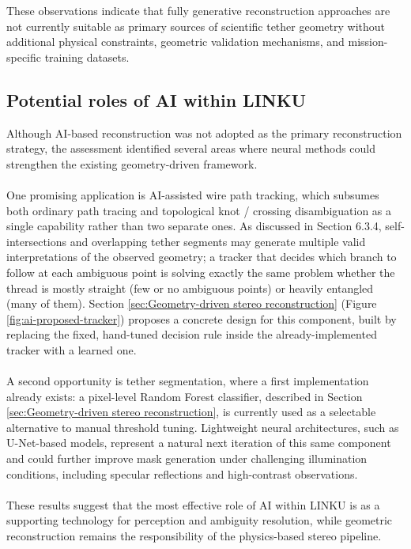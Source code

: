 These observations indicate that fully generative reconstruction approaches are not currently suitable as primary sources of scientific tether geometry without additional physical constraints, geometric validation mechanisms, and mission-specific training datasets.

\subsection{Potential roles of AI within LINKU}

Although AI-based reconstruction was not adopted as the primary reconstruction strategy, the assessment identified several areas where neural methods could strengthen the existing geometry-driven framework.
\\\\
One promising application is AI-assisted wire path tracking, which subsumes both ordinary path tracing and topological knot / crossing disambiguation as a single capability rather than two separate ones. As discussed in Section 6.3.4, self-intersections and overlapping tether segments may generate multiple valid interpretations of the observed geometry; a tracker that decides which branch to follow at each ambiguous point is solving exactly the same problem whether the thread is mostly straight (few or no ambiguous points) or heavily entangled (many of them). Section \ref{sec:Geometry-driven stereo reconstruction} (Figure \ref{fig:ai-proposed-tracker}) proposes a concrete design for this component, built by replacing the fixed, hand-tuned decision rule inside the already-implemented tracker with a learned one.
\\\\
A second opportunity is tether segmentation, where a first implementation already exists: a pixel-level Random Forest classifier, described in Section \ref{sec:Geometry-driven stereo reconstruction}, is currently used as a selectable alternative to manual threshold tuning. Lightweight neural architectures, such as U-Net-based models, represent a natural next iteration of this same component and could further improve mask generation under challenging illumination conditions, including specular reflections and high-contrast observations.
\\\\
These results suggest that the most effective role of AI within LINKU is as a supporting technology for perception and ambiguity resolution, while geometric reconstruction remains the responsibility of the physics-based stereo pipeline.

